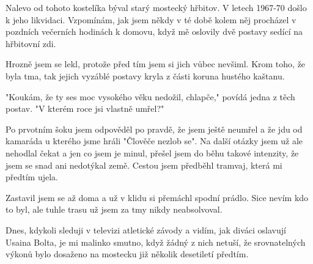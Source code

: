 
Nalevo od tohoto kostelíka býval starý mostecký hřbitov. V letech
1967-70 došlo k jeho likvidaci. Vzpomínám, jak jsem někdy v té době
kolem něj procházel v pozdních večerních hodinách k domovu, když mě
oslovily dvě postavy sedící na hřbitovní zdi.

Hrozně jsem se lekl, protože před tím jsem si jich vůbec nevšiml. Krom
toho, že byla tma, tak jejich vyzáblé postavy kryla z části koruna
hustého kaštanu.

"Koukám, že ty ses moc vysokého věku nedožil, chlapče," povídá jedna z
těch postav. "V kterém roce jsi vlastně umřel?"

Po prvotním šoku jsem odpověděl po pravdě, že jsem ještě neumřel a že
jdu od kamaráda u kterého jsme hráli "Člověče nezlob se". Na další
otázky jsem už ale nehodlal čekat a jen co jsem je minul, přešel jsem
do běhu takové intenzity, že jsem se snad ani nedotýkal země. Cestou
jsem předběhl tramvaj, která mi předtím ujela.

Zastavil jsem se až doma a už v klidu si přemáchl spodní prádlo. Sice
nevím kdo to byl, ale tuhle trasu už jsem za tmy nikdy neabsolvoval.

Dnes, kdykoli sleduji v televizi atletické závody a vidím, jak diváci
oslavují Usaina Bolta, je mi malinko smutno, když žádný z nich netuší,
že srovnatelných výkonů bylo dosaženo na mostecku již několik
desetiletí předtím.
